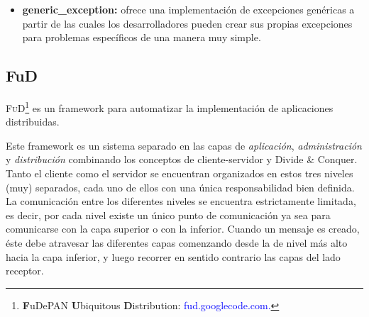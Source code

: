 \documentclass[12pt,a4paper,spanish]{article}
\begin{document}
\begin{itemize}
			\item \textbf{generic\_exception:} ofrece una implementación de excepciones genéricas a partir de las cuales los desarrolladores pueden crear 												sus propias excepciones para problemas específicos de una manera muy simple.
		\end{itemize}
		

	\subsection{FuD}
		\par \textsc{FuD}\footnote{\textbf{F}uDePAN \textbf{U}biquitous \textbf{D}istribution: \textcolor{blue}{fud.googlecode.com.}} es un framework para 			automatizar la implementación de aplicaciones distribuidas. 
		\par Este framework es un sistema separado en las capas de \textit{aplicación}, \textit{administración} y \textit{distribución} combinando los 			conceptos de cliente-servidor y Divide \& Conquer. Tanto el cliente como el servidor se encuentran organizados en estos tres niveles (muy) 			separados, cada uno de ellos con una única responsabilidad bien definida. La comunicación entre los diferentes niveles se encuentra estrictamente
		limitada, es decir, por cada nivel existe un único punto de comunicación ya sea para comunicarse con la capa superior o con la inferior. Cuando un 			mensaje es creado, éste debe atravesar las diferentes capas comenzando desde la de nivel más alto hacia la capa inferior, y luego recorrer en
		sentido contrario las capas del lado receptor.
\end{document}
